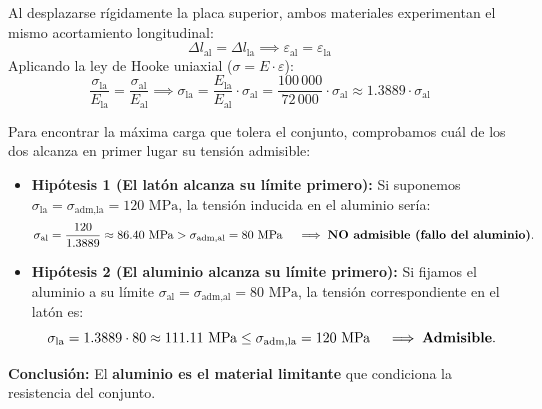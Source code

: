 {    

    Al desplazarse rígidamente la placa superior, ambos materiales experimentan el mismo acortamiento longitudinal:
    \begin{equation}
        \Delta l_{\text{al}} = \Delta l_{\text{la}} \implies \varepsilon_{\text{al}} = \varepsilon_{\text{la}}
    \end{equation}
    Aplicando la ley de Hooke uniaxial ($\sigma = E \cdot \varepsilon$):
    \begin{equation}
        \frac{\sigma_{\text{la}}}{E_{\text{la}}} = \frac{\sigma_{\text{al}}}{E_{\text{al}}} \implies \sigma_{\text{la}} = \frac{E_{\text{la}}}{E_{\text{al}}} \cdot \sigma_{\text{al}} = \frac{100\,000}{72\,000} \cdot \sigma_{\text{al}} \approx 1.3889 \cdot \sigma_{\text{al}}
    \end{equation}


    Para encontrar la máxima carga que tolera el conjunto, comprobamos cuál de los dos alcanza en primer lugar su tensión admisible:
    \begin{itemize}
        \item \textbf{Hipótesis 1 (El latón alcanza su límite primero):}
              Si suponemos $\sigma_{\text{la}} = \sigma_{\text{adm,la}} = 120\text{ MPa}$, la tensión inducida en el aluminio sería:
              \begin{equation}
                  \sigma_{\text{al}} = \frac{120}{1.3889} \approx 86.40\text{ MPa} > \sigma_{\text{adm,al}} = 80\text{ MPa} \quad \implies \text{\textbf{NO admisible (fallo del aluminio)}}.
              \end{equation}
        \item \textbf{Hipótesis 2 (El aluminio alcanza su límite primero):}
              Si fijamos el aluminio a su límite $\sigma_{\text{al}} = \sigma_{\text{adm,al}} = 80\text{ MPa}$, la tensión correspondiente en el latón es:
              \begin{equation}
                  \sigma_{\text{la}} = 1.3889 \cdot 80 \approx 111.11\text{ MPa} \le \sigma_{\text{adm,la}} = 120\text{ MPa} \quad \implies \text{\textbf{Admisible}}.
              \end{equation}
    \end{itemize}
    \textbf{Conclusión:} El \textbf{aluminio es el material limitante} que condiciona la resistencia del conjunto.

}
